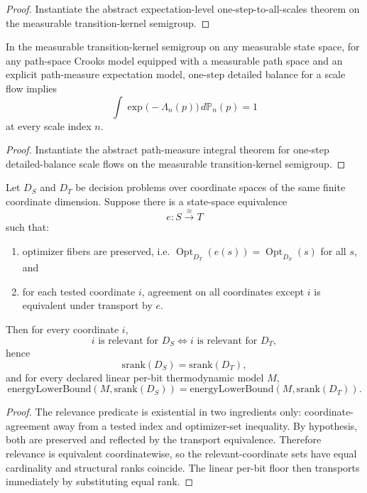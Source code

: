 \begin{proof}
Instantiate the abstract expectation-level one-step-to-all-scales theorem on the measurable transition-kernel semigroup.
\end{proof}

\begin{corollary}\label{thm:measurable-transition-path-measure-jarzynski-concrete-endpoint}
In the measurable transition-kernel semigroup on any measurable state space, for any path-space Crooks model equipped with a measurable path space and an explicit path-measure expectation model, one-step detailed balance for a scale flow implies
\[
\int \exp\bigl(-\Lambda_n(p)\bigr)\,d\mathbb P_n(p)=1
\]
at every scale index $n$.
\end{corollary}

\begin{proof}
Instantiate the abstract path-measure integral theorem for one-step detailed-balance scale flows on the measurable transition-kernel semigroup.
\end{proof}

\begin{theorem}\label{thm:encoding-transport-rank-energy}
Let $D_S$ and $D_T$ be decision problems over coordinate spaces of the same finite coordinate dimension. Suppose there is a state-space equivalence
\[
e:S\xrightarrow{\cong}T
\]
such that:
\begin{enumerate}
\item optimizer fibers are preserved, i.e. $\operatorname{Opt}_{D_T}(e(s))=\operatorname{Opt}_{D_S}(s)$ for all $s$, and
\item for each tested coordinate $i$, agreement on all coordinates except $i$ is equivalent under transport by $e$.
\end{enumerate}
Then for every coordinate $i$,
\[
i\text{ is relevant for }D_S\iff i\text{ is relevant for }D_T,
\]
hence
\[
\mathrm{srank}(D_S)=\mathrm{srank}(D_T),
\]
and for every declared linear per-bit thermodynamic model $M$,
\[
\mathrm{energyLowerBound}(M,\mathrm{srank}(D_S))
=
\mathrm{energyLowerBound}(M,\mathrm{srank}(D_T)).
\]
\end{theorem}

\begin{proof}
The relevance predicate is existential in two ingredients only: coordinate-agreement away from a tested index and optimizer-set inequality. By hypothesis, both are preserved and reflected by the transport equivalence. Therefore relevance is equivalent coordinatewise, so the relevant-coordinate sets have equal cardinality and structural ranks coincide. The linear per-bit floor then transports immediately by substituting equal rank.
\end{proof}

